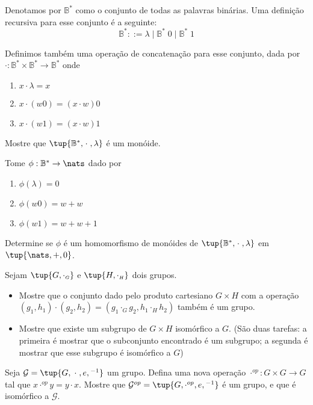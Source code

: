 \begin{exercise}
	Denotamos por $\mathbb{B}^*$ como o conjunto de todas as palavras binárias.
	Uma definição recursiva para esse conjunto é a seguinte:
	\[ \mathbb{B}^* ::= \lambda \;\vert\; \mathbb{B}^*\;\!0 \;\vert\; \mathbb{B}^*\;\!1 \]

	Definimos também uma operação de concatenação para esse conjunto, dada por
	$\cdot : \mathbb{B}^* \times \mathbb{B}^* \to \mathbb{B}^*$
	onde
	\begin{enumerate}
		\item $x \cdot \lambda = x$
		\item $x \cdot (w0) = (x \cdot w)0$
		\item $x \cdot (w1) = (x \cdot w)1$
	\end{enumerate}

	Mostre que $\tup{\mathbb{B}^*, \;\!\cdot\;, \lambda}$ é um monóide.
\end{exercise}

\begin{exercise}
	Tome $\phi : \mathbb{B}^* \to \nats$ dado por
	\begin{enumerate}
		\item $\phi(\lambda) = 0$
		\item $\phi(w0) = w + w$
		\item $\phi(w1) = w + w + 1$
	\end{enumerate}
	Determine se $\phi$ é um homomorfismo de monóides de $\tup{\mathbb{B}^*, \;\!\cdot\;, \lambda}$ em $\tup{\nats, +, 0}$.
\end{exercise}

\begin{exercise}
	Sejam $\tup{G, \cdot_{\scriptscriptstyle G}}$ e $\tup{H, \cdot_{\scriptscriptstyle H}}$ dois grupos.
	\begin{itemize}
		\item Mostre que o conjunto dado pelo produto cartesiano $G \times H$ com a operação
		$(g_1, h_1) \cdot (g_2, h_2) = (g_1 \cdot_{\scriptscriptstyle G} g_2, h_1 \cdot_{\scriptscriptstyle H} h_2)$
		também é um grupo.

		\item Mostre que existe um subgrupo de $G \times H$ isomórfico a $G$.
		(São duas tarefas: a primeira é mostrar que o subconjunto encontrado é um subgrupo; a segunda é mostrar que esse subgrupo é isomórfico a $G$)
	\end{itemize}
\end{exercise}

\begin{exercise}
	Seja $\mathcal{G} = \tup{G, \;\cdot\;, e, {}^{-1}}$ um grupo. Defina uma nova operação $\cdot^{op} : G \times G \to G$ tal que $x \cdot^{op} y = y \cdot x$.
	Mostre que $\mathcal{G}^{op} = \tup{G, \cdot^{op}, e, {}^{-1}}$ é um grupo, e que é isomórfico a $\mathcal{G}$. 
\end{exercise}